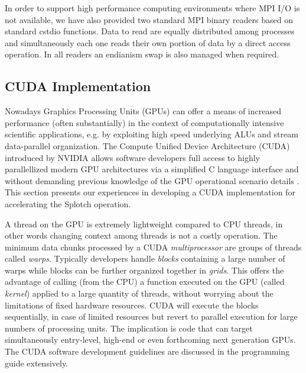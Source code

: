 In order to support high performance computing environments where MPI I/O is not available, 
we have also provided two standard MPI binary readers based on standard cstdio functions.
Data to read are equally distributed among processes and simultaneously each one reads
their own portion of data by a direct access operation. 
%
In all readers an endianism swap is also managed when required.



\subsection{CUDA Implementation}
\label{cuda}
Nowadays Graphics Processing Units (GPUs) can offer a means of increased performance 
(often substantially) in the context of computationally intensive scientific applications, 
e.g. by exploiting high speed underlying ALUs and stream data-parallel organization. 
The Compute Unified Device Architecture (CUDA) introduced by NVIDIA allows software 
developers full access to highly parallellized modern GPU architectures via a 
simplified C language interface and without demanding previous knowledge of the 
GPU operational scenario details \cite{cuda}. This section presents our experiences 
in developing a CUDA implementation for accelerating the Splotch operation.

A thread on the GPU is extremely lightweight compared to CPU threads, in other 
words changing context among threads is not a costly operation. The minimum 
data chunks processed by a CUDA {\it multiprocessor} are groups of threads called 
{\it warps}. Typically developers handle {\it blocks} containing a large number 
of warps while blocks can be further organized together in {\it grids}. This 
offers the advantage of calling (from the CPU) a function executed on the GPU 
(called {\it kernel}) applied to a large quantity of threads, without worrying about 
the limitations of fixed hardware resources. CUDA will execute the blocks sequentially, 
in case of limited resources but revert to parallel execution for large numbers 
of processing units.  The implication is code that can target simultaneously 
entry-level, high-end or even forthcoming next generation GPUs. The CUDA software 
development guidelines are discussed in the programming guide \cite{cudaprogguide} 
extensively.

